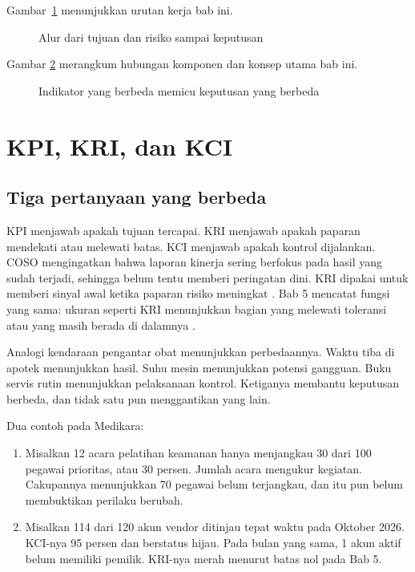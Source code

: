 Gambar~\ref{fig:ch13-alur} menunjukkan urutan kerja bab ini.

\begin{figure}[!htb]
  \centering
  
  \caption{Alur dari tujuan dan risiko sampai keputusan}
  \label{fig:ch13-alur}
\end{figure}

Gambar \ref{fig:ch13-ilustrasi-bab} merangkum hubungan komponen dan konsep utama bab ini.
\begin{figure}[!htb]
  \centering
  
  \caption{Indikator yang berbeda memicu keputusan yang berbeda}
  \label{fig:ch13-ilustrasi-bab}
\end{figure}

\section{KPI, KRI, dan KCI}

\subsection*{Tiga pertanyaan yang berbeda}

KPI menjawab apakah tujuan tercapai. KRI menjawab apakah paparan mendekati atau melewati batas.
KCI menjawab apakah kontrol dijalankan. COSO mengingatkan bahwa laporan kinerja sering berfokus
pada hasil yang sudah terjadi, sehingga belum tentu memberi peringatan dini. KRI dipakai untuk
memberi sinyal awal ketika paparan risiko meningkat \cite{c13-coso-kri}. Bab 5 mencatat fungsi
yang sama: ukuran seperti KRI menunjukkan bagian yang melewati toleransi atau yang masih berada
di dalamnya \cite{c05-nist-ir8286r1}.

Analogi kendaraan pengantar obat menunjukkan perbedaannya. Waktu tiba di apotek menunjukkan
hasil. Suhu mesin menunjukkan potensi gangguan. Buku servis rutin menunjukkan pelaksanaan kontrol.
Ketiganya membantu keputusan berbeda, dan tidak satu pun menggantikan yang lain.

Dua contoh pada Medikara:
\begin{enumerate}
  \item Misalkan 12 acara pelatihan keamanan hanya menjangkau 30 dari 100 pegawai prioritas, atau
  30 persen. Jumlah acara mengukur kegiatan. Cakupannya menunjukkan 70 pegawai belum terjangkau,
  dan itu pun belum membuktikan perilaku berubah.
  \item Misalkan 114 dari 120 akun vendor ditinjau tepat waktu pada Oktober 2026. KCI-nya 95 persen
  dan berstatus hijau. Pada bulan yang sama, 1 akun aktif belum memiliki pemilik. KRI-nya merah
  menurut batas nol pada Bab 5.
\end{enumerate}

